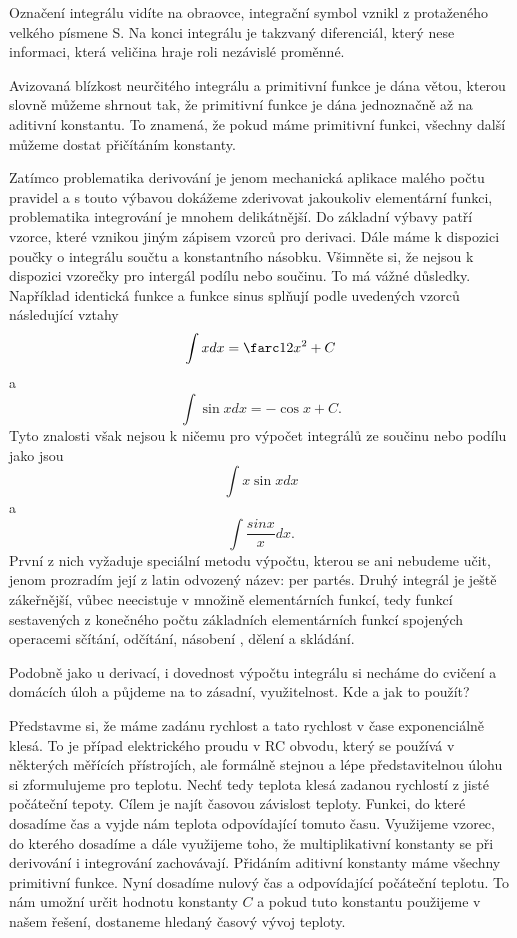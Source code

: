 \documentclass[12pt]{article}
\begin{document}
Označení integrálu vidíte na obraovce, integrační symbol vznikl z protaženého velkého písmene S. Na konci integrálu je takzvaný diferenciál, který nese informaci, která veličina hraje roli nezávislé proměnné.

Avizovaná blízkost neurčitého integrálu a primitivní funkce je dána větou, kterou slovně můžeme shrnout tak, že primitivní funkce je dána jednoznačně až na aditivní konstantu. To znamená, že pokud máme primitivní funkci, všechny další můžeme dostat přičítáním konstanty.

Zatímco problematika derivování je jenom mechanická aplikace malého počtu pravidel a s touto výbavou dokážeme zderivovat jakoukoliv elementární funkci, problematika integrování je mnohem delikátnější. Do základní výbavy patří vzorce, které vznikou jiným zápisem vzorců pro derivaci. Dále máme k dispozici poučky o integrálu součtu a konstantního násobku. Všimněte si, že nejsou k dispozici vzorečky pro intergál podílu nebo součinu. To má vážné důsledky. Například identická funkce a funkce sinus splňují podle uvedených vzorců následující vztahy
$$\int x dx = \farc 12 x^2+C$$
a
$$\int\sin xdx=-\cos x+C.$$
Tyto znalosti však nejsou k ničemu pro výpočet integrálů ze součinu nebo podílu jako jsou $$\int x\sin xdx$$ a $$\int \frac{sin x}{x}dx.$$ První z nich vyžaduje speciální metodu výpočtu, kterou se ani nebudeme učit, jenom prozradím její z latin odvozený název: per partés. Druhý integrál je ještě zákeřnější, vůbec neecistuje v množině elementárních funkcí, tedy funkcí sestavených z konečného počtu základních elementárních funkcí spojených operacemi sčítání, odčítání, násobení , dělení a skládání.

Podobně jako u derivací, i dovednost výpočtu integrálu si necháme do cvičení a domácích úloh a půjdeme na to zásadní, využitelnost. Kde a jak to použít?

Představme si, že máme zadánu rychlost a tato rychlost v čase exponenciálně klesá. To je případ elektrického proudu v RC obvodu, který se používá v některých měřících přístrojích, ale formálně stejnou a lépe představitelnou úlohu si zformulujeme pro teplotu. Nechť tedy teplota klesá zadanou rychlostí z jisté počáteční tepoty. Cílem je najít časovou závislost teploty. Funkci, do které dosadíme čas a vyjde nám teplota odpovídající tomuto času. Využijeme vzorec, do kterého dosadíme a dále využijeme toho, že multiplikativní konstanty se při derivování i integrování zachovávají. Přidáním aditivní konstanty máme všechny primitivní funkce. Nyní dosadíme nulový čas a odpovídající počáteční teplotu. To nám umožní určit hodnotu konstanty $C$ a pokud tuto konstantu použijeme v našem řešení, dostaneme hledaný časový vývoj teploty.
\end{document}
